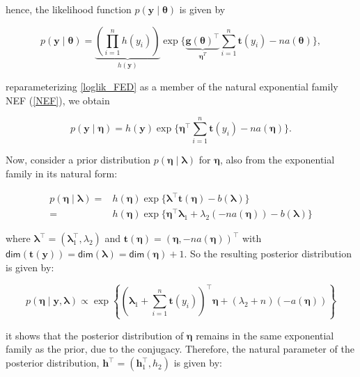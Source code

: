 \newpage

hence, the likelihood function $p(\bm{y}\mid\bm{\theta})$ is given by

\begin{equation}
\label{loglik_FED}
p(\bm{y}\mid\bm{\theta}) =\underbrace{\left(\prod_{i=1}^{n}h(y_i)\right)}_{h(\bm{y})}\exp{\lbrace{\underbrace{\bm{g(\bm{\theta})}^\top}_{\bm{\eta}^T} \sum_{i=1}^{n}\bm{t}\left(y_i\right)}-na(\bm{\theta})\rbrace},
\end{equation}

reparameterizing \ref{loglik_FED} as a member of the natural exponential family \textsf{NEF} (\ref{NEF}), we obtain

\begin{equation}
\label{loglik_FEDN}
p(\bm{y}\mid\bm{\eta}) = h(\bm{y})\exp{\lbrace{\bm{\eta}}^\top \sum_{i=1}^{n}\bm{t}\left(y_i\right)-na(\bm{\eta})\rbrace}.
\end{equation}


\vspace{0.5cm}

Now, consider a prior distribution $p(\bm{\eta}\mid\bm{\lambda})$ for $\bm{\eta}$, also from the exponential family in its natural form:

\begin{equation}
\label{etaprior}
\begin{split}
    p(\bm{\eta}\mid\bm{\lambda}) =& h(\bm{\eta})\exp{\lbrace{\bm{\lambda}}^\top\bm{t}\left(\bm{\eta}\right)}-b(\bm{\lambda})\rbrace\\
    =&h(\bm{\eta})\exp{\lbrace{\bm{\eta}^{\top}\bm{\lambda}_{1}+\lambda_2(-na(\bm{\eta}))-b(\bm{\lambda})\rbrace}}
\end{split}
\end{equation}

where $\bm{\lambda}^\top= (\bm{\lambda}_{1}^\top,\lambda_2)$  and $\bm{t}(\bm{\eta})=(\bm{\eta},-na(\bm{\eta}))^\top$ with $\mathsf{dim}(\bm{t}(\bm{y}))=\mathsf{dim}(\bm{\lambda})=\mathsf{dim}(\bm{\eta})+1$. So the resulting posterior distribution is given by:

\begin{equation}
\label{etaposterior}
p(\bm{\eta}\mid\bm{y},\bm{\lambda})\propto\exp{\left\lbrace\left(\bm{\lambda}_{1}+\sum_{i=1}^{n}\bm{t}\left(y_i\right)\right)^\top\bm{\eta}+\left(\lambda_2+n\right)\left(-a(\bm{\eta})\right)\right\rbrace}
\end{equation}

it shows that the posterior distribution of $\bm{\eta}$ remains in the same exponential family as the prior, due to the conjugacy. Therefore, the natural parameter of the posterior distribution, $\bm{h}^{\top}=(\bm{h}_{1}^{\top},h_{2})$ is given by:

